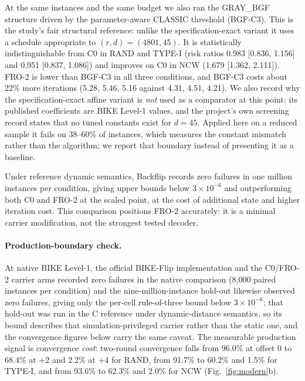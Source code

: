 \documentclass[lettersize,journal]{IEEEtran}
\begin{document}
At the same instances and the same budget we also ran the GRAY\_BGF structure driven by the parameter-aware CLASSIC threshold (BGF-C3). This is the study's fair structural reference: unlike the specification-exact variant it uses a schedule appropriate to $(r,d)=(4801,45)$. It is statistically indistinguishable from C0 in RAND and TYPE-I (risk ratios 0.983 [0.836, 1.156] and 0.951 [0.837, 1.086]) and improves on C0 in NCW (1.679 [1.362, 2.111]). FRO-2 is lower than BGF-C3 in all three conditions, and BGF-C3 costs about 22\% more iterations (5.28, 5.46, 5.16 against 4.31, 4.51, 4.21). We also record why the specification-exact affine variant is \emph{not} used as a comparator at this point: its published coefficients are BIKE Level-1 values, and the project's own screening record states that no tuned constants exist for $d=45$. Applied here on a reduced sample it fails on 38--60\% of instances, which measures the constant mismatch rather than the algorithm; we report that boundary instead of presenting it as a baseline.

Under reference dynamic semantics, Backflip records zero failures in one million instances per condition, giving upper bounds below $3\times10^{-6}$ and outperforming both C0 and FRO-2 at the scaled point, at the cost of additional state and higher iteration cost. This comparison positions FRO-2 accurately: it is a minimal carrier modification, not the strongest tested decoder.

\paragraph{Production-boundary check.} At native BIKE Level-1, the official BIKE-Flip implementation and the C0/FRO-2 carrier arms recorded zero failures in the native comparison (8{,}000 paired instances per condition) and the nine-million-instance hold-out likewise observed zero failures, giving only the per-cell rule-of-three bound below $3\times10^{-6}$; that hold-out was run in the C reference under dynamic-distance semantics, so its bound describes that simulation-privileged carrier rather than the static one, and the convergence figures below carry the same caveat. The measurable production signal is convergence \emph{cost}: two-round convergence falls from 96.0\% at offset $0$ to 68.4\% at $+2$ and 2.2\% at $+4$ for RAND, from 91.7\% to 60.2\% and 1.5\% for TYPE-I, and from 93.6\% to 62.3\% and 2.0\% for NCW (Fig.~\ref{fig:modern}b).
\end{document}
